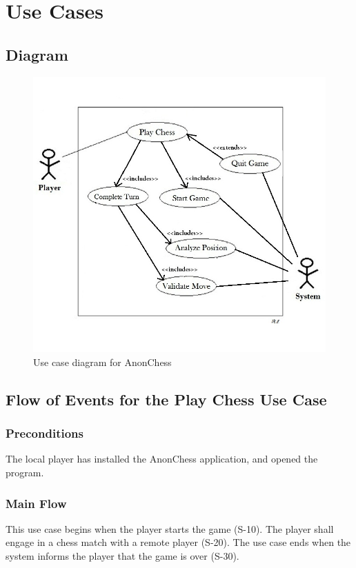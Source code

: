 \section{Use Cases}
\subsection{Diagram}
\begin{figure}[H]
   \centering
   \includegraphics[scale=0.5]{usecase.jpg}
   \caption{Use case diagram for AnonChess}
  \end{figure}
\subsection{Flow of Events for the Play Chess Use Case}
\label{playchess}
\subsubsection{Preconditions}
The local player has installed the AnonChess application, and opened the program.
\subsubsection{Main Flow}
This use case begins when the player starts the game (S-10). The player shall engage in a chess match with a remote player (S-20). The use case ends when the system informs the player that the game is over (S-30).
